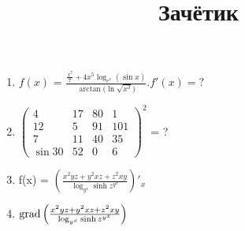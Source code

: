 \documentclass{article}
\date{}
\title{Зачётик}
\begin{document}
	\maketitle
\begin{enumerate}
	\item $f(x)$ = $\frac{\frac{x^7}{7} + 4x^5 \log_{e^x}{(\sin{x})} }{\arctan{(\ln{\sqrt{x^3}}})}. f'(x) = ?$
	\item $\left( \begin{array}{cccc}
		4&17&80&1\\
		12&5&91&101\\
		7&11&40&35\\
		\sin{30}&52&0&6
	\end{array} \right)^2$ = ?
	\item f(x) = $\left(\frac{x^2yz +y^2xz + z^2xy}{\log_{y^x}{\sinh{z^{y^x}}}}\right)'_x$
	\item ${\rm grad} \left( \frac{x^2yz +y^2xz + z^2xy}{\log_{y^x}{\sinh{z^{y^x}}}} \right)$ 
\end{enumerate}
\end{document}
